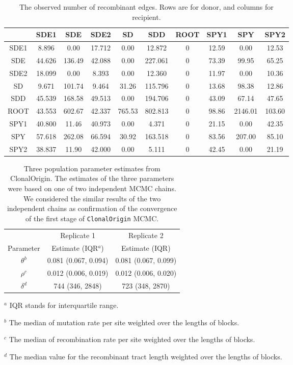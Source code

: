 \documentclass[english]{article}
\providecommand{\tabularnewline}{\\}
\begin{document}
\begin{table}
\caption{\label{tab:obsheatmap}The observed number of recombinant edges.
Rows are for donor, and columns for recipient.}
\noindent \centering{}\begin{tabular}{cccccccccc}
\hline
& SDE1 & SDE & SDE2 & SD & SDD & ROOT & SPY1 & SPY & SPY2 \tabularnewline
\hline
SDE1&8.896 &  0.00 &17.712  & 0.00 & 12.872   & 0 &12.59  &  0.00  &12.53\tabularnewline
SDE &44.626& 136.49& 42.088 &  0.00& 227.061  &  0& 73.39 &  99.95 & 65.25\tabularnewline
SDE2&18.099&   0.00&  8.393 &  0.00&  12.360  &  0& 11.97 &   0.00 & 10.36\tabularnewline
SD  &9.671 &101.74 & 9.464  &31.26 &115.796   & 0 &13.68  & 98.38  &12.86\tabularnewline
SDD &45.539& 168.58& 49.513 &  0.00& 194.706  &  0& 43.09 &  67.14 & 47.65\tabularnewline
ROOT&43.553& 602.67& 42.337 &765.53& 802.813  &  0& 98.86 &2146.01 &103.60\tabularnewline
SPY1&40.800&  11.46& 40.973 &  0.00&   4.371  &  0& 21.15 &   0.00 & 42.35\tabularnewline
SPY &57.618& 262.08& 66.594 & 30.92& 163.518  &  0& 83.56 & 207.00 & 85.10\tabularnewline
SPY2&38.837&  11.90& 42.000 &  0.00&   5.111  &  0& 42.45 &   0.00 & 21.19\tabularnewline
\hline
\end{tabular}
\end{table}
\clearpage{}


\begin{table}
\caption{\label{tab:three}Three population parameter estimates from
ClonalOrigin. 
The estimates of the three parameters were based on one of two independent
MCMC chains.  We considered the similar 
results of the two independent chains as confirmation of 
the convergence of the first stage of \texttt{ClonalOrigin} MCMC.
}
\noindent \begin{centering}
\begin{tabular}{ccc}
\hline
& Replicate 1 & Replicate 2\tabularnewline
Parameter & Estimate (IQR$^a$) & Estimate (IQR)\tabularnewline
\hline
$\theta^b$ & 0.081 (0.067, 0.094) & 0.081 (0.067, 0.099)\tabularnewline
$\rho^c$ & 0.012 (0.006, 0.019) & 0.012 (0.006, 0.020)\tabularnewline
$\delta^d$ & 744 (346, 2848) & 723 (348, 2870)\tabularnewline
\hline
\end{tabular}
\par\end{centering}

$^a$ IQR stands for interquartile range.

$^b$ The median of mutation rate per site weighted over the lengths of blocks. 

$^c$ The median of recombination rate per site weighted over the lengths of blocks.

$^d$ The median value for the recombinant tract length weighted over the lengths of blocks.

\end{table}
\clearpage{}
\end{document}
